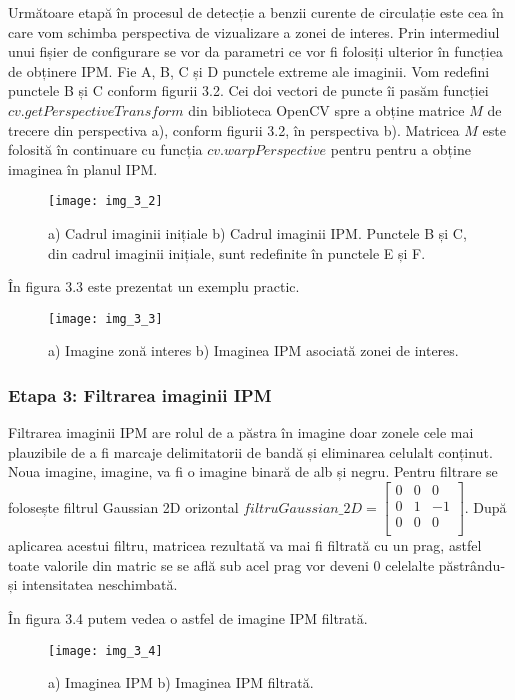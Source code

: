 Următoare etapă în procesul de detecție a benzii curente de circulație este cea în care vom schimba perspectiva de vizualizare a zonei de interes. Prin intermediul unui fișier de configurare se vor da parametri ce vor fi folosiți ulterior în funcțiea de obținere IPM. Fie A, B, C și D punctele extreme ale imaginii. Vom redefini punctele B și C conform figurii 3.2. Cei doi vectori de puncte îi pasăm funcției $cv.getPerspectiveTransform$ din biblioteca OpenCV spre a obține matrice $M$ de trecere din perspectiva a), conform figurii 3.2, în perspectiva b). Matricea $M$ este folosită în continuare cu funcția $cv.warpPerspective$ pentru pentru a obține imaginea în planul IPM.
\begin{figure}[!h]
	\centering
	\texttt{[image: img\_3\_2]}
	\caption[Transformare IPM]{a) Cadrul imaginii inițiale b) Cadrul imaginii IPM. Punctele B și C, din cadrul imaginii inițiale, sunt redefinite în punctele E și F.}
\end{figure}

În figura 3.3 este prezentat un exemplu practic.
\begin{figure}[!h]
	\centering
	\texttt{[image: img\_3\_3]}
	\caption[Transformare IPM în practică]{a) Imagine zonă interes b) Imaginea IPM asociată zonei de interes.}
\end{figure}


\subsubsection{Etapa 3: Filtrarea imaginii IPM}

Filtrarea imaginii IPM are rolul de a păstra în imagine doar zonele cele mai plauzibile de a fi marcaje delimitatorii de bandă și eliminarea celulalt conținut. Noua imagine, imagine, va fi o imagine binară de alb și negru. Pentru filtrare se folosește filtrul Gaussian 2D orizontal
$ filtruGaussian\_2D = 
\begin{bmatrix}
	0 & 0 & 0 \\
	0 & 1 & -1 \\
	0 & 0 & 0 \\
\end{bmatrix}
$. După aplicarea acestui filtru, matricea rezultată va mai fi filtrată cu un prag, astfel toate valorile din matric se se află sub acel prag vor deveni 0 celelalte păstrându-și intensitatea neschimbată.

În figura 3.4 putem vedea o astfel de imagine IPM filtrată.
\begin{figure}[!h]
	\centering
	\texttt{[image: img\_3\_4]}
	\caption[Imagine IPM filtrată]{a) Imaginea IPM b) Imaginea IPM filtrată.}
\end{figure}

